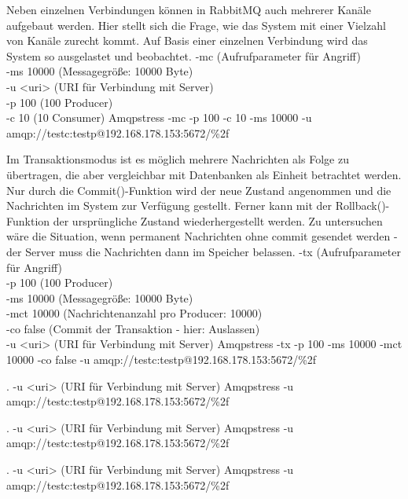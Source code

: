 \documentclass[	a4paper,
			11pt,
			titlepage,
			oneside,
			fleqn,
			listof=totoc,
			parskip,
			numbers=noenddot]{scrartcl}
\begin{document}
		
		{%
		 Neben einzelnen Verbindungen können in RabbitMQ auch mehrerer Kanäle aufgebaut werden. Hier stellt sich die Frage, wie das System mit einer Vielzahl von Kanäle zurecht kommt.
		 Auf Basis einer einzelnen Verbindung wird das System so ausgelastet und beobachtet.
		}{%
		 -mc (Aufrufparameter für Angriff) \\
		 -ms 10000 (Messagegröße: 10000 Byte) \\
		 -u <uri> (URI für Verbindung mit Server) \\
		 -p 100 (100 Producer) \\
		 -c 10 (10 Consumer)
		}{%
		 Amqpstress -mc -p 100 -c 10 -ms 10000 -u amqp://testc:testp@192.168.178.153:5672/\%2f
		}


		{%
		 Im Transaktionsmodus ist es möglich mehrere Nachrichten als Folge zu übertragen, die aber vergleichbar mit Datenbanken als Einheit betrachtet werden. Nur durch die Commit()-Funktion
		 wird der neue Zustand angenommen und die Nachrichten im System zur Verfügung gestellt. Ferner kann mit der Rollback()-Funktion der ursprüngliche Zustand wiederhergestellt werden.
		 Zu untersuchen wäre die Situation, wenn permanent Nachrichten ohne commit gesendet werden - der Server muss die Nachrichten dann im Speicher belassen.
		}{%
		 -tx (Aufrufparameter für Angriff) \\
		 -p 100 (100 Producer) \\
		 -ms 10000 (Messagegröße: 10000 Byte) \\
		 -mct 10000 (Nachrichtenanzahl pro Producer: 10000) \\
		 -co false (Commit der Transaktion - hier: Auslassen) \\
		 -u <uri> (URI für Verbindung mit Server)
		}{%
		 Amqpstress -tx -p 100 -ms 10000 -mct 10000 -co false -u amqp://testc:testp@192.168.178.153:5672/\%2f
		}
	
	
		{%
		 .
		}{%
		 -u <uri> (URI für Verbindung mit Server)
		}{%
		 Amqpstress -u amqp://testc:testp@192.168.178.153:5672/\%2f
		}


		{%
		 .
		}{%
		 -u <uri> (URI für Verbindung mit Server)
		}{%
		 Amqpstress -u amqp://testc:testp@192.168.178.153:5672/\%2f
		}


		{%
		 .
		}{%
		 -u <uri> (URI für Verbindung mit Server)
		}{%
		 Amqpstress  -u amqp://testc:testp@192.168.178.153:5672/\%2f
		}
	
\end{document}
